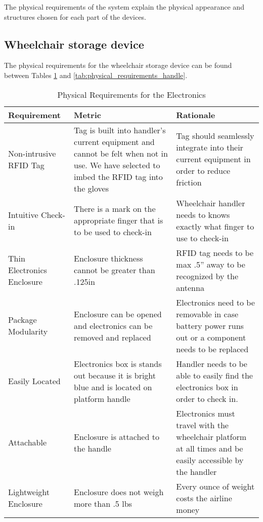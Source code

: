 The physical requirements of the system explain the physical appearance and structures chosen for each part of the devices. 

\subsection*{Wheelchair storage device}

The physical requirements for the wheelchair storage device can be found between Tables \ref{tab:physical_requirements_electronics} and \ref{tab:physical_requirements_handle}.

\clearpage
\newpage

\begin{table}
\begin{tabular} {| p{4cm} | p{5cm} | p{5cm} |}
\hline
\textbf{Requirement} & \textbf{Metric} & \textbf{Rationale} \\ \hline

Non-intrusive RFID Tag & Tag is built into handler's current equipment and cannot be felt when not in use. We have selected to imbed the RFID tag into the gloves &
Tag should seamlessly integrate into their current equipment in order to reduce friction \\ \hline
Intuitive Check-in & There is a mark on the appropriate finger that is to be used to check-in & Wheelchair handler needs to knows exactly what finger to use to check-in \\ \hline
Thin Electronics Enclosure & Enclosure thickness cannot be greater than .125in & RFID tag needs to be max .5” away to be recognized by the antenna \\ \hline
Package Modularity & Enclosure can be opened and electronics can be removed and replaced & 
Electronics need to be removable in case battery power runs out or a component needs to be replaced  \\ \hline
Easily Located & Electronics box is stands out because it is bright blue and is located on platform handle &
Handler needs to be able to easily find the electronics box in order to check in. \\ \hline
Attachable & Enclosure is attached to the handle & Electronics must travel with the wheelchair platform at all times and be easily accessible by the handler \\ \hline
Lightweight Enclosure & Enclosure does not weigh more than .5 lbs & Every ounce of weight costs the airline money
 \\ \hline
\end{tabular} 
\caption{Physical Requirements for the Electronics}
\label{tab:physical_requirements_electronics}
\end{table}

